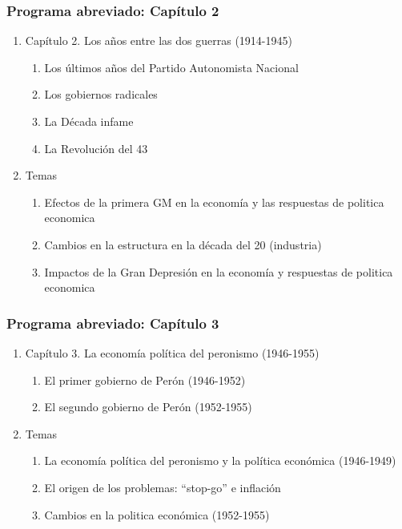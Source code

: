 \documentclass[14pt,aspectratio=169]{beamer}
\begin{document}
\begin{frame}\frametitle{Programa abreviado: Capítulo 2}
     \begin{enumerate}
     \item Capítulo 2. Los años entre las dos guerras (1914-1945)
       \begin{enumerate}
       \item Los últimos años del Partido Autonomista Nacional
       \item Los gobiernos radicales
       \item La Década infame
         \item La Revolución del 43
         \end{enumerate}
       \item Temas
         \begin{enumerate}
           \item Efectos de la primera GM en la economía y las
             respuestas de politica economica
           \item Cambios en la estructura en la década del 20
             (industria)
             \item Impactos de la Gran Depresión en la economía y
               respuestas de politica economica
             \end{enumerate}
             \end{enumerate}
  \end{frame}


\begin{frame}\frametitle{Programa abreviado: Capítulo 3}
     \begin{enumerate}
     \item Capítulo 3. La economía política del peronismo (1946-1955)
       \begin{enumerate}
       \item El primer gobierno de Perón (1946-1952)
       \item El segundo gobierno de Perón (1952-1955)
       \end{enumerate}
     \item Temas
       \begin{enumerate}
         \item La economía política del peronismo y la política
           económica (1946-1949)
         \item El origen de los problemas: ``stop-go'' e inflación
           \item Cambios en la politica económica (1952-1955)
           \end{enumerate}
           \end{enumerate}
  \end{frame}
\end{document}
